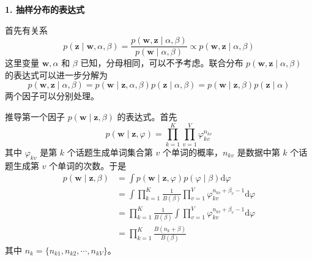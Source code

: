 \documentclass[UTF8,12pt,a4paper,fontset=fandol]{ctexart}
\begin{document}
\noindent\textbf{1. 抽样分布的表达式}

首先有关系
\begin{equation}
p(\mathbf{z}\mid\mathbf{w},\alpha,\beta)=\frac{p(\mathbf{w},\mathbf{z}\mid\alpha,\beta)}{p(\mathbf{w}\mid\alpha,\beta)}\propto p(\mathbf{w},\mathbf{z}\mid\alpha,\beta)
\tag{20.20}
\end{equation}
这里变量 $\mathbf{w},\alpha$ 和 $\beta$ 已知，分母相同，可以不予考虑。联合分布 $p(\mathbf{w},\mathbf{z}\mid\alpha,\beta)$ 的表达式可以进一步分解为
\begin{equation}
p(\mathbf{w},\mathbf{z}\mid\alpha,\beta)=p(\mathbf{w}\mid\mathbf{z},\alpha,\beta)p(\mathbf{z}\mid\alpha,\beta)=p(\mathbf{w}\mid\mathbf{z},\beta)p(\mathbf{z}\mid\alpha)
\tag{20.21}
\end{equation}
两个因子可以分别处理。

推导第一个因子 $p(\mathbf{w}\mid\mathbf{z},\beta)$ 的表达式。首先
\begin{equation}
p(\mathbf{w}\mid\mathbf{z},\varphi)=\prod_{k=1}^K\prod_{v=1}^V \varphi_{kv}^{n_{kv}}
\tag{20.22}
\end{equation}
其中 $\varphi_{kv}$ 是第 $k$ 个话题生成单词集合第 $v$ 个单词的概率，$n_{kv}$ 是数据中第 $k$ 个话题生成第 $v$ 个单词的次数。于是
\begin{equation}
\begin{aligned}
p(\mathbf{w}\mid\mathbf{z},\beta)
&=\int p(\mathbf{w}\mid\mathbf{z},\varphi)p(\varphi\mid\beta)\mathrm{d}\varphi\\
&=\int \prod_{k=1}^K \frac{1}{B(\beta)}\prod_{v=1}^V \varphi_{kv}^{n_{kv}+\beta_v-1}\mathrm{d}\varphi\\
&=\prod_{k=1}^K \frac{1}{B(\beta)}\int \prod_{v=1}^V \varphi_{kv}^{n_{kv}+\beta_v-1}\mathrm{d}\varphi\\
&=\prod_{k=1}^K \frac{B(n_k+\beta)}{B(\beta)}
\end{aligned}
\tag{20.23}
\end{equation}
其中 $n_k=\{n_{k1},n_{k2},\cdots,n_{kV}\}$。
\end{document}
